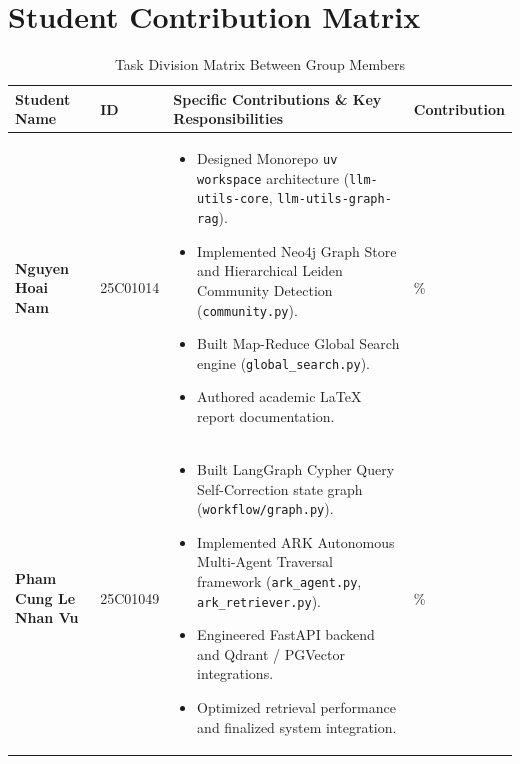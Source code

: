 \documentclass[11pt,a4paper]{report}
\begin{document}
\section{Student Contribution Matrix}

\begin{table}[h!]
\centering
\caption{Task Division Matrix Between Group Members}
\label{tab:task_division_en}
\small
\begin{tabularx}{\textwidth}{>{\raggedright\arraybackslash}p{3.8cm} >{\centering\arraybackslash}p{2.2cm} X >{\centering\arraybackslash}p{1.8cm}}
\toprule
\textbf{Student Name} & \textbf{ID} & \textbf{Specific Contributions \& Key Responsibilities} & \textbf{Contribution} \\
\midrule
\textbf{Nguyen Hoai Nam} & 25C01014 &
\begin{itemize}[leftmargin=*,noitemsep,topsep=0pt,partopsep=0pt,parsep=0pt]
\item Designed Monorepo \texttt{uv workspace} architecture (\texttt{llm-utils-core}, \texttt{llm-utils-graph-rag}).
\item Implemented Neo4j Graph Store and Hierarchical Leiden Community Detection (\texttt{community.py}).
\item Built Map-Reduce Global Search engine (\texttt{global\_search.py}).
\item Authored academic LaTeX report documentation.
\end{itemize} & 50\% \\[0.2cm]
\midrule
\textbf{Pham Cung Le Nhan Vu} & 25C01049 &
\begin{itemize}[leftmargin=*,noitemsep,topsep=0pt,partopsep=0pt,parsep=0pt]
\item Built LangGraph Cypher Query Self-Correction state graph (\texttt{workflow/graph.py}).
\item Implemented ARK Autonomous Multi-Agent Traversal framework (\texttt{ark\_agent.py}, \texttt{ark\_retriever.py}).
\item Engineered FastAPI backend and Qdrant / PGVector integrations.
\item Optimized retrieval performance and finalized system integration.
\end{itemize} & 50\% \\
\bottomrule
\end{tabularx}
\end{table}

\newpage
{}


\end{document}
